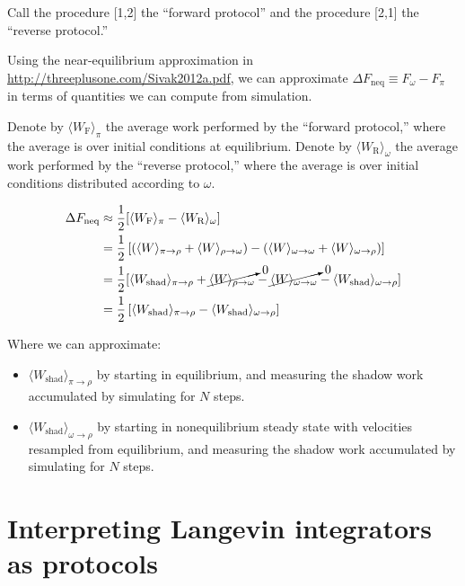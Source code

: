 \documentclass[11pt]{article}
\begin{document}
Call the procedure [1,2] the ``forward protocol'' and the procedure [2,1] the ``reverse protocol.''

Using the near-equilibrium approximation in \url{http://threeplusone.com/Sivak2012a.pdf}, we can approximate $\Delta F_\text{neq} \equiv F_\omega - F_\pi$  in terms of quantities we can compute from simulation.

Denote by $\langle W_\text{F} \rangle_\pi$ the average work performed by the ``forward protocol,'' where the average is over initial conditions at equilibrium. Denote by $\langle W_\text{R} \rangle_\omega$ the average work performed by the ``reverse protocol,'' where the average is over initial conditions distributed according to $\omega$.

$$\begin{aligned}
\Delta F_\text{neq}
& \approx
\frac{1}{2} [ \langle W_\text{F} \rangle_\pi - \langle W_\text{R} \rangle_\omega ]\\
&= \frac{1}{2}
\left[
\left(
\langle W \rangle_{\pi \to \rho}
+ \langle W \rangle_{\rho \to \omega}
\right)
- \left(
\langle W \rangle_{\omega \to \omega} + 
\langle W \rangle_{\omega \to \rho}
\right)
\right]\\
&= \frac{1}{2} [
\langle W_\text{shad} \rangle_{\pi \to \rho}
+ \cancelto{0}{\langle W \rangle_{\rho \to \omega}}
- 
\cancelto{0}{\langle W \rangle_{\omega \to \omega}} 
- 
\langle W_\text{shad} \rangle_{\omega \to \rho} ]\\
&= \frac{1}{2} \left[
\langle W_\text{shad} \rangle_{\pi \to \rho}
- \langle W_\text{shad} \rangle_{\omega \to \rho} \right]\\
\end{aligned}$$

Where we can approximate:
\begin{itemize}
\item $\langle W_\text{shad} \rangle_{\pi \to \rho}$ by starting in equilibrium, and measuring the shadow work accumulated by simulating for $N$ steps.
\item $\langle W_\text{shad} \rangle_{\omega \to \rho}$ by starting in nonequilibrium steady state with velocities resampled from equilibrium, and measuring the shadow work accumulated by simulating for $N$ steps.
\end{itemize}

\section{Interpreting Langevin integrators as protocols}
\end{document}
